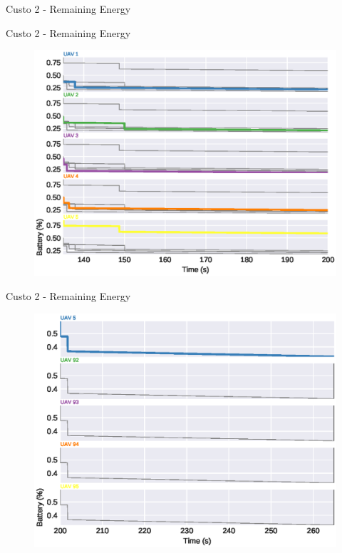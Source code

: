 \begin{frame}{Custo 2 - Remaining Energy}
                \end{frame}\begin{frame}{Custo 2 - Remaining Energy}
                    \begin{figure}[!htb]
                        \includegraphics[width=\textwidth]{custo_2/uav_remaining_energy_200.eps}
                    \end{figure}
                \end{frame}\begin{frame}{Custo 2 - Remaining Energy}
                    \begin{figure}[!htb]
                        \includegraphics[width=\textwidth]{custo_2/uav_remaining_energy_265.eps}

\end{figure}
\end{frame}
